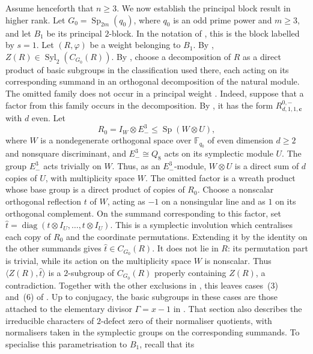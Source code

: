 \documentclass[10pt]{amsart}
\theoremstyle{definition}
\renewcommand{\leq}{\leqslant}
\renewcommand{\geq}{\geqslant}
\let\oldendproof\endproof
\renewenvironment{proof}[1][\proofname]{%
  \oldproof[\bfseries #1]%
}{\oldendproof}
\DeclareMathOperator{\Sp}{Sp}
\DeclareMathOperator{\Syl}{Syl}
\newcommand{\F}{\mathbb F}
\numberwithin{equation}{section}
\numberwithin{table}{section}
\begin{document}
\begin{proof}
\enlargethispage{2pt}
Assume henceforth that $n\geq3$.
We now establish the principal block result in higher rank.
Let $G_0=\Sp_{2m}(q_0)$, where $q_0$ is an odd prime power and
$m\geq3$, and let $B_1$ be its principal $2$-block.
In the notation of \cite[Section~5]{FengMalle2022}, this is the
block labelled by $s=1$.
Let $(R,\varphi)$ be a weight belonging to $B_1$.
By \cite[Lemma~2.3]{FengYuZhang2024},
$Z(R)\in\Syl_2(C_{G_0}(R))$.
By \cite[Theorem~3.37]{FengYuZhang2024}, choose a decomposition of
$R$ as a direct product of basic subgroups in the classification used there, each acting on its
corresponding summand in an orthogonal decomposition of the natural
module.
The omitted family does not occur in a principal weight
\cite[Remark~3.50]{FengYuZhang2024}. Indeed, suppose that a factor from this
family occurs in the decomposition.
By \cite[Proposition~3.48(4)]{FengYuZhang2024}, it has the form
$R^{0,-}_{d,1,1,\mathbf c}$ with $d$ even.  Let
\[
 R_0=I_W\otimes E_-^3\leq\Sp(W\otimes U),
\]
where $W$ is a nondegenerate orthogonal space over $\F_{q_0}$ of even
dimension $d\geq2$ and nonsquare discriminant, and
$E_-^3\cong Q_8$ acts on its symplectic module $U$.
The group $E_-^3$ acts trivially on $W$.  Thus, as an $E_-^3$-module,
$W\otimes U$ is a direct sum of $d$ copies of $U$, with multiplicity space $W$.
The omitted factor is a wreath product whose base group is a direct
product of copies of $R_0$. Choose a nonscalar orthogonal reflection
$t$ of $W$, acting as $-1$ on a nonsingular line and as $1$ on its
orthogonal complement. On the summand corresponding to this factor, set
$\widehat t=\operatorname{diag}(t\otimes I_U,\ldots,t\otimes I_U)$.  This is a symplectic
involution which centralises each copy of $R_0$ and the coordinate
permutations.  Extending it by the identity on the other summands gives
  $\widehat t\in C_{G_0}(R)$.  It does not lie in $R$: its permutation part is
trivial, while its action on the multiplicity space $W$ is nonscalar.
  Thus $\langle Z(R),\widehat t\rangle$ is a $2$-subgroup of $C_{G_0}(R)$
properly containing $Z(R)$, a contradiction. Together with the other
exclusions in \cite[Remark~3.50]{FengYuZhang2024}, this leaves cases~(3) and~(6) of
\cite[Proposition~3.48]{FengYuZhang2024}.
Up to conjugacy, the basic subgroups in these cases are those attached to
the elementary divisor $\Gamma=x-1$ in \cite[Section~5.1]{FengMalle2022}.
That section also describes the irreducible characters of $2$-defect zero
of their normaliser quotients, with normalisers taken in the symplectic
groups on the corresponding summands.  To specialise this parametrisation to $B_1$, recall that its

\end{proof}
\end{document}
